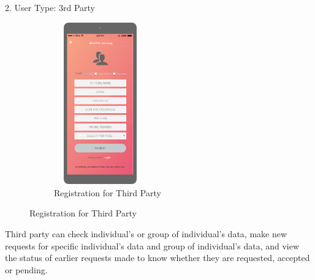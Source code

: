 2. User Type: 3rd Party

\begin{figure}[H]
	\centering
	\begin{subfigure}[b]{0.4\textwidth}	
		\includegraphics[width=4cm,height=7cm]		{./Mockups/2_T-Register.png}
      	\caption{Registration for Third Party}
        \label{TrackMe_register2}
	 \end{subfigure}
\end{figure}

Third party can check individual's or group of individual's data, make new requests for specific individual's data and group of individual's data, and view the status of earlier requests made to know whether they are requested, accepted or pending.

